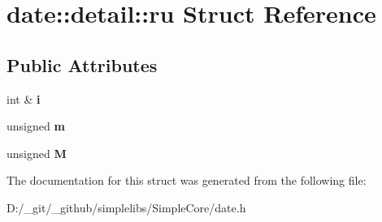 \hypertarget{structdate_1_1detail_1_1ru}{}\section{date\+::detail\+::ru Struct Reference}
\label{structdate_1_1detail_1_1ru}
\subsection*{Public Attributes}
\begin{DoxyCompactItemize}
\item 
\mbox{\label{structdate_1_1detail_1_1ru_aeea3c9b51ae9be996593ea6e07ddf922}} 
int \& {\bfseries i}
\item 
\mbox{\label{structdate_1_1detail_1_1ru_a41002680bd9cc3deb36ae1254b500c9a}} 
unsigned {\bfseries m}
\item 
\mbox{\label{structdate_1_1detail_1_1ru_a87aad385edc91f06c76650d5996739c0}} 
unsigned {\bfseries M}
\end{DoxyCompactItemize}


The documentation for this struct was generated from the following file\+:\begin{DoxyCompactItemize}
\item 
D\+:/\+\_\+git/\+\_\+github/simplelibs/\+Simple\+Core/date.\+h\end{DoxyCompactItemize}
